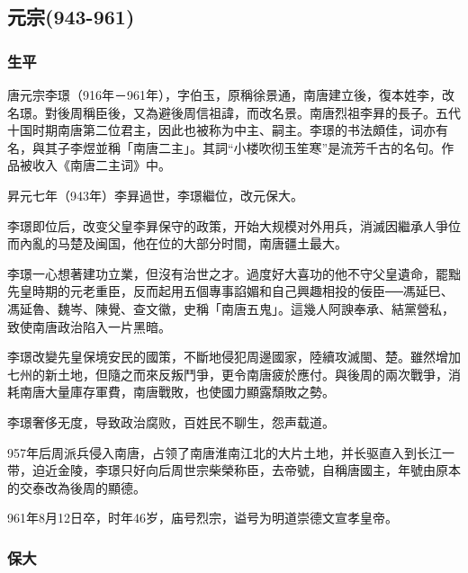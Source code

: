 
\subsection{元宗\tiny(943-961)}

\subsubsection{生平}

唐元宗李璟（916年－961年），字伯玉，原稱徐景通，南唐建立後，復本姓李，改名璟。對後周稱臣後，又為避後周信祖諱，而改名景。南唐烈祖李昪的長子。五代十国时期南唐第二位君主，因此也被称为中主、嗣主。李璟的书法頗佳，词亦有名，與其子李煜並稱「南唐二主」。其詞“小楼吹彻玉笙寒”是流芳千古的名句。作品被收入《南唐二主词》中。

昇元七年（943年）李昪過世，李璟繼位，改元保大。

李璟即位后，改变父皇李昪保守的政策，开始大规模对外用兵，消滅因繼承人爭位而內亂的马楚及闽国，他在位的大部分时間，南唐疆土最大。

李璟一心想著建功立業，但沒有治世之才。過度好大喜功的他不守父皇遺命，罷黜先皇時期的元老重臣，反而起用五個專事諂媚和自己興趣相投的佞臣──馮延巳、馮延魯、魏岑、陳覺、查文徽，史稱「南唐五鬼」。這幾人阿諛奉承、結黨營私，致使南唐政治陷入一片黑暗。

李璟改變先皇保境安民的國策，不斷地侵犯周邊國家，陸續攻滅閩、楚。雖然增加七州的新土地，但隨之而來反叛鬥爭，更令南唐疲於應付。與後周的兩次戰爭，消耗南唐大量庫存軍費，南唐戰敗，也使國力顯露頹敗之勢。

李璟奢侈无度，导致政治腐败，百姓民不聊生，怨声载道。

957年后周派兵侵入南唐，占领了南唐淮南江北的大片土地，并长驱直入到长江一带，迫近金陵，李璟只好向后周世宗柴榮称臣，去帝號，自稱唐國主，年號由原本的交泰改為後周的顯德。

961年8月12日卒，时年46岁，庙号烈宗，谥号为明道崇德文宣孝皇帝。

\subsubsection{保大}


